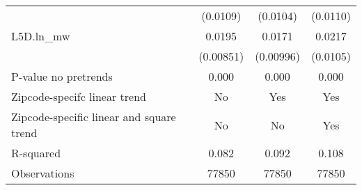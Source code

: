 {\begin{tabular}{l*{3}{c}}
          & (0.0109)         & (0.0104)         & (0.0110)         \\
[1em]
L5D.ln\_mw &   0.0195\sym{**} &   0.0171\sym{*}  &   0.0217\sym{**} \\
          &(0.00851)         &(0.00996)         & (0.0105)         \\
\hline
P-value no pretrends&    0.000         &    0.000         &    0.000         \\
Zipcode-specifc linear trend&       No         &      Yes         &      Yes         \\
Zipcode-specific linear and square trend&       No         &       No         &      Yes         \\
R-squared &    0.082         &    0.092         &    0.108         \\
Observations&    77850         &    77850         &    77850         \\
\hline\hline
\end{tabular}
}
